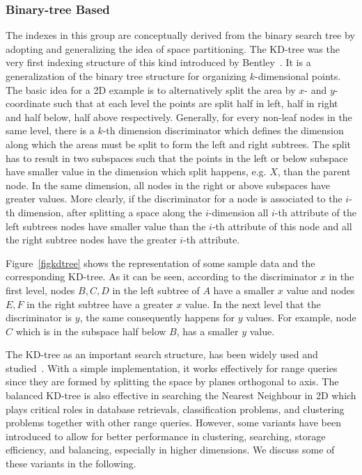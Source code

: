 \documentclass[a4paper,12pt]{article}
\begin{document}
\subsubsection{Binary-tree Based}
\label{binary-tree-based}
The indexes in this group are conceptually derived from the binary search tree by adopting and generalizing the idea of space partitioning. 
The KD-tree was the very first indexing structure of this kind introduced by Bentley~\cite{bently1975}. 
It is a generalization of the binary tree structure for organizing $k$-dimensional points. The basic idea for a 2D example is to alternatively split the area by $x$- and $y$-coordinate such that at each level the points are split half in left, half in right and half below, half above respectively. Generally, for every non-leaf nodes in the same level, there is a $k$-th dimension discriminator which defines the dimension along which the areas must be split to form the left and right subtrees. The split has to result in two subspaces such that the points in the left or below subspace have smaller value in the dimension which split happens, e.g. $X$, than the parent node. In the same dimension, all nodes in the right or above subspaces have greater values. More clearly, if the discriminator for a node is associated to the $i$-th dimension, after splitting a space along the $i$-dimension all $i$-th attribute of the left subtrees nodes have smaller value than the $i$-th attribute of this node and all the right subtree nodes have the greater $i$-th attribute. 

Figure~\ref{figkdtree} shows the representation of some sample data and the corresponding KD-tree. As it can be seen, according to the discriminator $x$ in the first level, nodes $B, C, D$ in the left subtree of $A$ have a smaller $x$ value and nodes $E, F$ in the right subtree have a greater $x$ value. In the next level that the discriminator is $y$, the same consequently happens for $y$ values. For example, node $C$ which is in the subspace half below $B$, has a smaller $y$ value.

The KD-tree as an important search structure, has been widely used and studied~\cite{ilprints723}. With a simple implementation, it works effectively for range queries since they are formed by splitting the space by planes orthogonal to axis. The balanced KD-tree is also effective in searching the Nearest Neighbour in 2D which plays critical roles in database retrievals, classification problems, and clustering problems together with other range queries. However, some variants have been introduced to allow for better performance in clustering, searching, storage efficiency,  
and balancing, especially in higher dimensions. We discuss some of these variants in the following.
\end{document}
